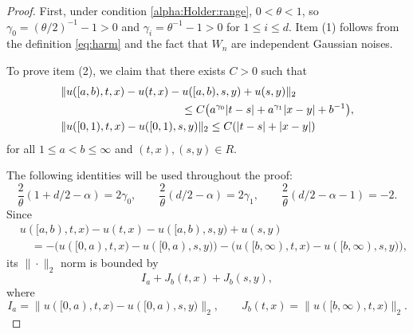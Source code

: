 \documentclass[reqno]{amsart}
\newcommand{\1}{\mathbf 1}
\numberwithin{equation}{section}
\theoremstyle{definition}
\begin{document}
\begin{proof}
First, under condition \eqref{alpha:Holder:range}, \(0<\theta<1\), so
\(\gamma_0=(\theta/2)^{-1}-1>0\) and
\(\gamma_i=\theta^{-1}-1>0\) for \(1\le i\le d\).
Item (1) follows from the definition \eqref{eq:harm} and the fact that $W_n$ are independent Gaussian noises. 

To prove item (2), we claim that there exists $C>0$ such that
\begin{align*}
	&\|u([a,b),t,x)-u(t,x)-u([a,b),s,y)+u(s,y)\|_{2}\\
	&\hskip1.5in \le C\bigl(a^{\gamma_0}|t-s|+a^{\gamma_1}|x-y|+b^{-1}\bigr),\\
	& \|u([0,1),t,x) - u([0,1),s,y)\|_2 \le C (|t-s|+|x-y|)
\end{align*}
for all $1\le a <b \le \infty$ and $(t,x),(s,y) \in R$.

The following identities will be used throughout the proof:
\[
    \frac{2}{\theta}(1+d/2-\alpha)=2\gamma_0,
    \qquad
    \frac{2}{\theta}(d/2-\alpha)=2\gamma_1,
    \qquad
    \frac{2}{\theta}(d/2-\alpha-1)=-2 .
\]
Since
\[
\begin{aligned}
&u([a,b),t,x)-u(t,x)-u([a,b),s,y)+u(s,y)  \\
&\quad =
    -\bigl(u([0,a),t,x)-u([0,a),s,y)\bigr)
    -\bigl(u([b,\infty),t,x)-u([b,\infty),s,y)\bigr),
\end{aligned}
\]
its $\|\cdot\|_2$ norm is bounded by
\[
    I_a+J_b(t,x)+J_b(s,y),
\]
where
\[
    I_a=\|u([0,a),t,x)-u([0,a),s,y)\|_2,
    \qquad
    J_b(t,x)=\|u([b,\infty),t,x)\|_2 .
\]


\end{proof}
\end{document}
